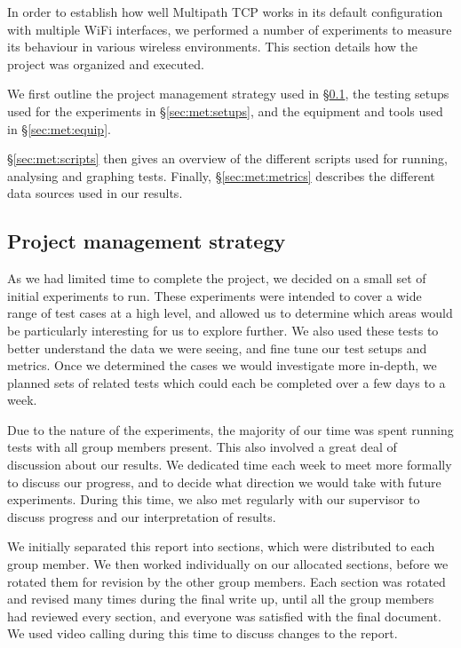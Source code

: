 In order to establish how well Multipath TCP works in its default configuration
with multiple WiFi interfaces, we performed a number of experiments to
measure its behaviour in various wireless environments.
This section details how the project was organized and executed.

We first outline the project management strategy used in \S\ref{sec:met:pm}, 
the testing setups used for the experiments in \S\ref{sec:met:setups}, 
and the equipment and tools used in \S\ref{sec:met:equip}.

\S\ref{sec:met:scripts} then gives an overview of the different scripts used for
running, analysing and graphing tests. Finally, \S\ref{sec:met:metrics}
describes the different data sources used in our results.

\subsection{Project management strategy}
\label{sec:met:pm}
As we had limited time to complete the project, we decided on a small set
of initial experiments to run. These experiments were intended
to cover a wide range of test cases at a high level, and allowed us to determine
which areas would be particularly interesting for us to explore further.
We also used these tests to better understand the data we were seeing, and
fine tune our test setups and metrics. Once we determined the cases we would
investigate more in-depth, we planned sets of related tests which could
each be completed over a few days to a week.

Due to the nature of the experiments, the majority of our time was spent
running tests with all group members present. This also involved a great
deal of discussion about our results. We dedicated time each week to
meet more formally to discuss our progress, and to decide what direction we would
take with future experiments. During this time, we also met regularly with
our supervisor to discuss progress and our interpretation of results.

We initially separated this report into sections, which were distributed to
each group member. We then worked individually on our allocated sections, before
we rotated them for revision by the other group members. Each section was
rotated and revised many times during the final write up, until all the group members
had reviewed every section, and everyone was satisfied with the final document. We used video calling during this time
to discuss changes to the report.

